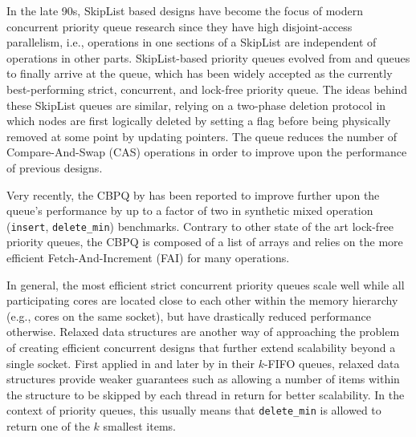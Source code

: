 \documentclass[a4paper,11pt]{article}
\begin{document}

In the late 90s, SkipList \cite{pugh1998concurrent,pugh1990skip} based designs have become the focus
of modern concurrent priority queue research
\cite{alistarhspraylist,herlihy2012art,linden2013skiplist,shavit2000skiplist,sundell2003fast}
since they have high disjoint-access parallelism, i.e., operations in one sections of a SkipList
are independent of operations in other parts.
SkipList-based priority queues evolved from \citeauthor{shavit2000skiplist}
\cite{shavit2000skiplist} and \citeauthor{sundell2003fast} \cite{sundell2003fast} queues
to finally arrive at the \citeauthor{linden2013skiplist} \cite{linden2013skiplist} queue,
which has been widely accepted as the currently best-performing strict, concurrent, and lock-free
priority queue. The ideas behind these SkipList queues are similar, relying on a two-phase deletion
protocol in which nodes are first logically deleted by setting a flag before being physically
removed at some point by updating pointers. The \citeauthor{linden2013skiplist} queue reduces
the number of Compare-And-Swap (CAS) operations in order to improve upon the performance of previous
designs.


Very recently, the CBPQ by \citeauthor{cbpq} \cite{cbpq} has been reported to improve further upon
the \citeauthor{linden2013skiplist} queue's performance by up to a factor of two in synthetic
mixed operation (\lstinline|insert|, \lstinline|delete_min|) benchmarks. Contrary to other state of
the art lock-free priority queues, the CBPQ is composed of a list of arrays and relies on the
more efficient Fetch-And-Increment (FAI) for many operations.


In general, the most efficient strict concurrent priority queues scale well while
all participating cores are located close to each other within the memory hierarchy
(e.g., cores on the same socket), but have drastically reduced performance otherwise.
Relaxed data structures are another way of approaching the problem of creating efficient
concurrent designs that further extend scalability beyond a single socket.
First applied in \cite{afek2010quasi} and later by \citeauthor{kirsch2012fast} \cite{kirsch2012fast} in their
$k$-FIFO queues, relaxed data structures provide weaker guarantees such as allowing a number
of items within the structure to be skipped by each thread in return for better
scalability. In the context of priority queues, this usually means that \lstinline|delete_min|
is allowed to return one of the $k$ smallest items.
\end{document}
